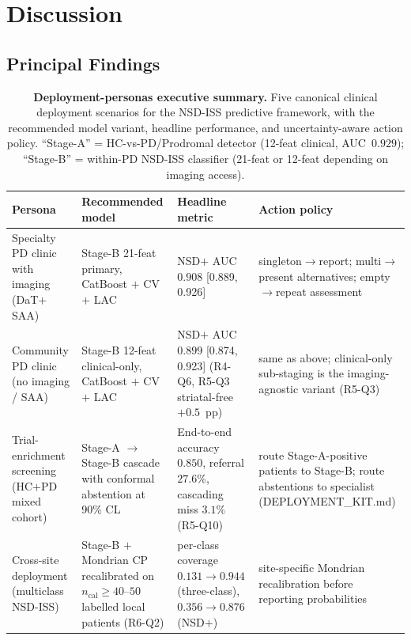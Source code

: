 \documentclass[10pt,letterpaper]{article}
\begin{document}
\section*{Discussion}
\label{p1:sec:discussion}

\subsection*{Principal Findings}

\begin{table}[!t]
\caption{\textbf{Deployment-personas executive summary.} Five canonical clinical deployment scenarios for the NSD-ISS predictive framework, with the recommended model variant, headline performance, and uncertainty-aware action policy. ``Stage-A'' = HC-vs-PD/Prodromal detector (12-feat clinical, AUC~$0.929$); ``Stage-B'' = within-PD NSD-ISS classifier (21-feat or 12-feat depending on imaging access).}
\label{p1:tab:deployment-personas}
\centering
\footnotesize
\setlength{\tabcolsep}{3pt}
\begin{tabular}{@{}p{2.4cm}p{2.6cm}p{2.0cm}p{2.0cm}@{}}
\toprule
\textbf{Persona} & \textbf{Recommended model} & \textbf{Headline metric} & \textbf{Action policy} \\
\midrule
Specialty PD clinic with imaging (DaT$+$SAA) & Stage-B 21-feat primary, CatBoost $+$ CV$+$ LAC & NSD$+$ AUC $0.908$ [0.889, 0.926] & singleton$\to$report; multi$\to$present alternatives; empty$\to$repeat assessment \\
\midrule
Community PD clinic (no imaging / SAA) & Stage-B 12-feat clinical-only, CatBoost $+$ CV$+$ LAC & NSD$+$ AUC $0.899$ [0.874, 0.923] (R4-Q6, R5-Q3 striatal-free $+0.5$~pp) & same as above; clinical-only sub-staging is the imaging-agnostic variant (R5-Q3) \\
\midrule
Trial-enrichment screening (HC$+$PD mixed cohort) & Stage-A $\to$ Stage-B cascade with conformal abstention at 90\% CL & End-to-end accuracy $0.850$, referral $27.6\%$, cascading miss $3.1\%$ (R5-Q10) & route Stage-A-positive patients to Stage-B; route abstentions to specialist (DEPLOYMENT\_KIT.md) \\
\midrule
Cross-site deployment (multiclass NSD-ISS) & Stage-B $+$ Mondrian CP recalibrated on $n_{\mathrm{cal}}{\geq}40$--$50$ labelled local patients (R6-Q2) & per-class coverage $0.131 \to 0.944$ (three-class), $0.356 \to 0.876$ (NSD$+$) & site-specific Mondrian recalibration before reporting probabilities \\

\end{tabular}
\end{table}
\end{document}
